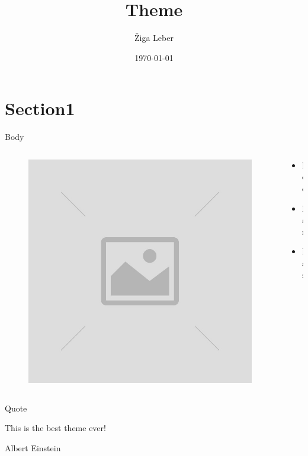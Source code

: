 \documentclass{beamer}
\title{Theme}
\date{\today}
\author{Žiga Leber}
\institute{Programming mehtodology laboratory}
\begin{document}
\maketitle

\section{Section1}

\begin{frame}{Body}
  \begin{columns}
    \begin{column}{0.5\textwidth}
      \begin{figure}
        \includegraphics[width=\columnwidth]{images/image-placeholder.jpg}
      \end{figure}
    \end{column}
    \begin{column}{0.5\textwidth}
      \begin{itemize}
        \item Foo
        \item Bar
        \item Baz
      \end{itemize}
    \end{column}
  \end{columns}
\end{frame}

\begin{frame}{Quote}
  \begin{Large}
    This is the best theme ever!
  \end{Large}

  \small{Albert Einstein}
\end{frame}
\end{document}
